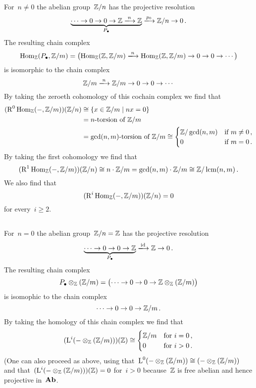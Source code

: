 For~$n \neq 0$ the abelian group~$\mathbb{Z}/n$ has the projective resolution
\[
  \underbrace{
  \dotsb
  \to
  0
  \to
  0
  \to
  \Integer
  \xlongto{n}
  \Integer
  }_{\Pcc}
  \xlongto{p_0}
  \Integer/n
  \to
  0 \,.
\]
The resulting chain complex
\[
  \Hom_\Integer(\Pcc, \Integer/m)
  =
  \bigl(
    \Hom_\Integer(\Integer,\Integer/m)
    \xlongto{n}
    \Hom_\Integer(\Integer,\Integer/m)
    \to
    0
    \to
    0
    \to
    \dotsb
  \bigr)
\]
is isomorphic to the chain complex
\[
  \Integer/m
  \xlongto{n}
  \Integer/m
  \to
  0
  \to
  0
  \to
  \dotsb
\]
By taking the zeroeth cohomology of this cochain complex we find that
\begin{align*}
  ( \Right^0 \Hom_\Integer(-,\Integer/m) )(\Integer/n)
  &\cong
  \{
  x \in \Integer/m
  \suchthat
  nx = 0  
  \}
  \\
  &=
  \text{\dash{$n$}{torsion} of~$\Integer/m$}
  \\
  &=
  \text{\dash{$\gcd(n,m)$}{torsion} of~$\Integer/m$}
  \cong
  \begin{cases}
    \Integer/\gcd(n,m)  & \text{if~$m \neq 0$}  \,, \\
    0                   & \text{if~$m = 0$}     \,.
  \end{cases}
\end{align*}
By taking the first cohomology we find that
\[
  ( \operatorname{R}^1 \operatorname{Hom}_{\mathbb{Z}}(-,\mathbb{Z}/m) )(\mathbb{Z}/n)
  \cong
  n \cdot \mathbb{Z}/m
  =
  \gcd(n,m) \cdot \mathbb{Z}/m
  \cong
  \mathbb{Z}/\operatorname{lcm}(n,m) \,.
\]
We also find that
\[
  ( \operatorname{R}^i \operatorname{Hom}_{\mathbb{Z}}(-,\mathbb{Z}/m) )(\mathbb{Z}/n)
  = 0
\]
for every~$i \geq 2$.





\subsection{}

For~$n = 0$ the abelian group~$\mathbb{Z}/n = \mathbb{Z}$ has the projective resolution
\[
  \underbrace{
  \dotsb
  \to
  0
  \to
  0
  \to
  \Integer
  }_{\Pcc}
  \xlongto{\id}
  \Integer
  \to
  0 \,.
\]
The resulting chain complex
\[
  P_\bullet \otimes_{\mathbb{Z}} (\mathbb{Z}/m)
  =
  \bigl(
  \dotsb
  \to
  0
  \to
  0
  \to
  \mathbb{Z} \otimes_{\mathbb{Z}} (\mathbb{Z}/m)
  \bigr)
\]
is isomophic to the chain complex
\[
  \dotsb
  \to
  0
  \to
  0
  \to
  \mathbb{Z}/m \,.
\]
By taking the homology of this chain complex we find that
\[
  ( \operatorname{L}^i (- \otimes_{\mathbb{Z}} (\mathbb{Z}/m)) )(\mathbb{Z})
  \cong
  \begin{cases}
    \mathbb{Z}/m  & \text{for~$i = 0$}  \,, \\
    0           & \text{for~$i > 0$}  \,.
  \end{cases}
\]
(One can also proceed as above, using that~$\operatorname{L}^0 (- \otimes_{\mathbb{Z}} (\mathbb{Z}/m)) \cong (- \otimes_{\mathbb{Z}} (\mathbb{Z}/m))$ and that~$(\operatorname{L}^i (- \otimes_{\mathbb{Z}} (\mathbb{Z}/m)))(\mathbb{Z}) = 0$ for~$i > 0$ because~$\mathbb{Z}$ is free abelian and hence projective in~$\mathbf{Ab}$.

